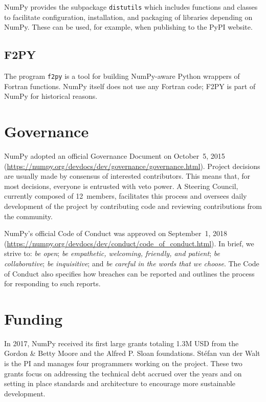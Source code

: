 NumPy provides the subpackage \texttt{distutils} which includes functions and classes
to facilitate configuration, installation, and packaging of libraries depending on NumPy.
These can be used, for example, when publishing to the PyPI website.

\subsection*{F2PY}  The program \texttt{f2py} is a tool for
building NumPy-aware Python wrappers of Fortran functions.
NumPy itself does not use any Fortran code;  F2PY is part of NumPy
for historical reasons.


\section*{Governance}

NumPy adopted an official Governance Document on October~5,
2015 (\url{https://numpy.org/devdocs/dev/governance/governance.html}).
Project decisions are usually made by consensus of interested contributors.
This means that, for most decisions, everyone is entrusted with veto power.
A Steering Council, currently composed of 12~members, facilitates this
process and oversees daily development of the project by contributing code
and reviewing contributions from the community.

NumPy's official Code of Conduct was approved on September~1, 2018
(\url{https://numpy.org/devdocs/dev/conduct/code_of_conduct.html}).
In brief, we strive to:
\emph{be open};
\emph{be empathetic, welcoming, friendly, and patient};
\emph{be collaborative};
\emph{be inquisitive}; and
\emph{be careful in the words that we choose}.
The Code of Conduct also specifies how breaches can be reported and outlines
the process for responding to such reports.

\section*{Funding}

In 2017, NumPy received its first large grants totaling 1.3M USD from the
Gordon \& Betty Moore and the Alfred P. Sloan foundations.
Stéfan van der Walt is the PI and manages four programmers working on the project.
These two grants focus on addressing the technical debt accrued over the years and
on setting in place standards and architecture to encourage more sustainable development.


